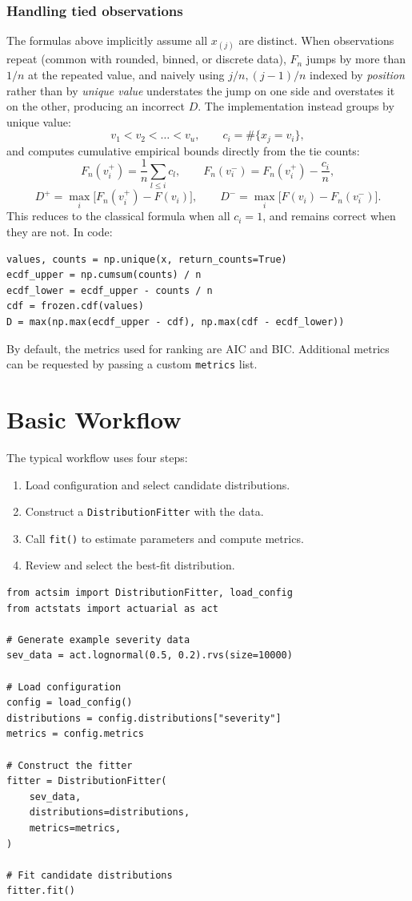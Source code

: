 \subsubsection{Handling tied observations}
The formulas above implicitly assume all $x_{(j)}$ are distinct. When observations repeat
(common with rounded, binned, or discrete data), $F_n$ jumps by more than $1/n$ at the
repeated value, and naively using $j/n, (j-1)/n$ indexed by \emph{position} rather than by
\emph{unique value} understates the jump on one side and overstates it on the other,
producing an incorrect $D$. The implementation instead groups by unique value:
\[
v_1 < v_2 < \dots < v_u, \qquad c_i = \#\{x_j = v_i\},
\]
and computes cumulative empirical bounds directly from the tie counts:
\[
F_n(v_i^+) = \frac{1}{n}\sum_{l \le i} c_l, \qquad
F_n(v_i^-) = F_n(v_i^+) - \frac{c_i}{n},
\]
\[
D^+ = \max_i \big[F_n(v_i^+) - F(v_i)\big], \qquad
D^- = \max_i \big[F(v_i) - F_n(v_i^-)\big].
\]
This reduces to the classical formula when all $c_i = 1$, and remains correct when they are
not. In code:
\begin{lstlisting}
values, counts = np.unique(x, return_counts=True)
ecdf_upper = np.cumsum(counts) / n
ecdf_lower = ecdf_upper - counts / n
cdf = frozen.cdf(values)
D = max(np.max(ecdf_upper - cdf), np.max(cdf - ecdf_lower))
\end{lstlisting}

By default, the metrics used for ranking are AIC and BIC. Additional
metrics can be requested by passing a custom \texttt{metrics} list.

\section{Basic Workflow}

The typical workflow uses four steps:

\begin{enumerate}[leftmargin=*]
    \item Load configuration and select candidate distributions.
    \item Construct a \texttt{DistributionFitter} with the data.
    \item Call \texttt{fit()} to estimate parameters and compute metrics.
    \item Review and select the best-fit distribution.
\end{enumerate}

\begin{lstlisting}[style=pythonstyle]
from actsim import DistributionFitter, load_config
from actstats import actuarial as act

# Generate example severity data
sev_data = act.lognormal(0.5, 0.2).rvs(size=10000)

# Load configuration
config = load_config()
distributions = config.distributions["severity"]
metrics = config.metrics

# Construct the fitter
fitter = DistributionFitter(
    sev_data,
    distributions=distributions,
    metrics=metrics,
)

# Fit candidate distributions
fitter.fit()
\end{lstlisting}

